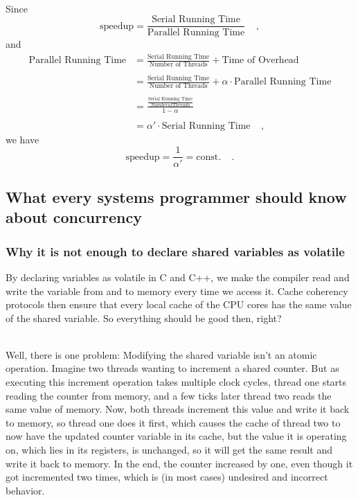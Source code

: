 \documentclass[../../main.tex]{subfiles}
\begin{document}
~\\
Since
\[
    \text{speedup} = \frac{\text{Serial Running Time}}{\text{Parallel Running Time}} \ \ \ \ \ ,
\]
and
\begin{align*}
    \text{Parallel Running Time} &= \frac{\text{Serial Running Time}}{\text{Number of Threads}} + \text{Time of Overhead} \\ \\
    &= \frac{\text{Serial Running Time}}{\text{Number of Threads}} + \alpha \cdot \text{Parallel Running Time} \\ \\
    &= \frac{\frac{\text{Serial Running Time}}{Number of Threads}}{1-\alpha} \\ \\
    &= \alpha' \cdot \text{Serial Running Time} \ \ \ \ \ ,
\end{align*}
we have
\[
    \text{speedup} = \frac{1}{\alpha'} = \text{const.} \ \ \ \ \ .
\]


\newpage
\subsection{What every systems programmer should know about concurrency}
\subsubsection{Why it is not enough to declare shared variables as volatile}
By declaring variables as volatile in C and C++, we make the compiler read and write the variable from and to memory every time we access it.
Cache coherency protocols then ensure that every local cache of the CPU cores has the same value of the shared variable.
So everything should be good then, right?

~\\
Well, there is one problem: Modifying the shared variable isn't an atomic operation.
Imagine two threads wanting to increment a shared counter.
But as executing this increment operation takes multiple clock cycles, thread one starts reading the counter from memory, and a few ticks later thread two reads the same value of memory.
Now, both threads increment this value and write it back to memory, so thread one does it first, which causes the cache of thread two to now have the updated counter variable in its cache, but the value it is operating on, which lies in its registers, is unchanged, so it will get the same result and write it back to memory.
In the end, the counter increased by one, even though it got incremented two times, which is (in most cases) undesired and incorrect behavior.
\end{document}
